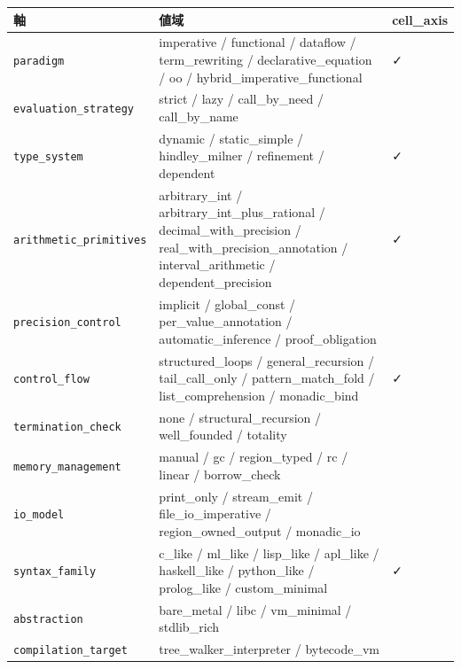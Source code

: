 \documentclass[
]{ltjsarticle}
\newcounter{none} %
\begin{document}
{\def\LTcaptype{none} %
\begin{longtable}[]{@{}
  >{\raggedright\arraybackslash}p{}
  >{\raggedright\arraybackslash}p{}
  >{\raggedright\arraybackslash}p{}@{}}
\toprule\noalign{}
\begin{minipage}[b]{\linewidth}\raggedright
軸
\end{minipage} & \begin{minipage}[b]{\linewidth}\raggedright
値域
\end{minipage} & \begin{minipage}[b]{\linewidth}\raggedright
cell\_axis
\end{minipage} \\
\midrule\noalign{}
\endhead
\bottomrule\noalign{}
\endlastfoot
\texttt{paradigm} & imperative / functional / dataflow / term\_rewriting
/ declarative\_equation / oo / hybrid\_imperative\_functional & ✓ \\
\texttt{evaluation\_strategy} & strict / lazy / call\_by\_need /
call\_by\_name & \\
\texttt{type\_system} & dynamic / static\_simple / hindley\_milner /
refinement / dependent & ✓ \\
\texttt{arithmetic\_primitives} & arbitrary\_int /
arbitrary\_int\_plus\_rational / decimal\_with\_precision /
real\_with\_precision\_annotation / interval\_arithmetic /
dependent\_precision & ✓ \\
\texttt{precision\_control} & implicit / global\_const /
per\_value\_annotation / automatic\_inference / proof\_obligation & \\
\texttt{control\_flow} & structured\_loops / general\_recursion /
tail\_call\_only / pattern\_match\_fold / list\_comprehension /
monadic\_bind & ✓ \\
\texttt{termination\_check} & none / structural\_recursion /
well\_founded / totality & \\
\texttt{memory\_management} & manual / gc / region\_typed / rc / linear
/ borrow\_check & \\
\texttt{io\_model} & print\_only / stream\_emit / file\_io\_imperative /
region\_owned\_output / monadic\_io & \\
\texttt{syntax\_family} & c\_like / ml\_like / lisp\_like / apl\_like /
haskell\_like / python\_like / prolog\_like / custom\_minimal & ✓ \\
\texttt{abstraction} & bare\_metal / libc / vm\_minimal / stdlib\_rich
& \\
\texttt{compilation\_target} & tree\_walker\_interpreter / bytecode\_vm
& \\
\end{longtable}
}
\end{document}
